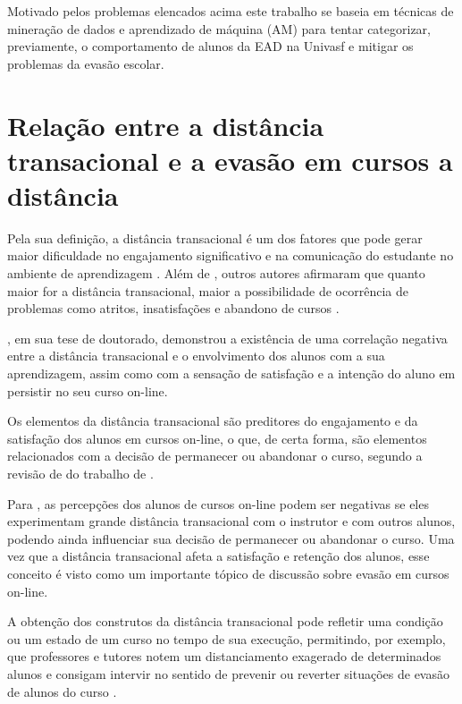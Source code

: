 Motivado pelos problemas elencados acima este trabalho se baseia em técnicas de
mineração de dados e aprendizado de máquina (AM) para tentar categorizar,
previamente, o comportamento de alunos da EAD na Univasf e mitigar os problemas
da evasão escolar.

\section{Relação entre a distância transacional e a evasão em cursos a distância}

Pela sua definição, a distância transacional é um dos fatores que pode gerar
maior dificuldade no engajamento significativo e na comunicação do estudante no
ambiente de aprendizagem \cite{goel2012transactional}. Além de
, outros autores afirmaram que quanto maior for a
distância transacional, maior a possibilidade de ocorrência de problemas como
atritos, insatisfações e abandono de cursos
\cite{zhang2003transactional,steinman2007educational,horzum2011developing,
mbwesa2014transactional,paul2015revisiting}.

, em sua tese de doutorado, demonstrou a
existência de uma correlação negativa entre a distância transacional e o
envolvimento dos alunos com a sua aprendizagem, assim como com a sensação de
satisfação e a intenção do aluno em persistir no seu curso on-line.

Os elementos da distância transacional são preditores do engajamento e da
satisfação dos alunos em cursos on-line, o que, de certa forma, são elementos
relacionados com a decisão de permanecer ou abandonar o curso, segundo a revisão
de  do trabalho de
.

Para , as percepções dos alunos de cursos
on-line podem ser negativas se eles experimentam grande distância transacional
com o instrutor e com outros alunos, podendo ainda influenciar sua decisão de
permanecer ou abandonar o curso. Uma vez que a distância transacional afeta a
satisfação e retenção dos alunos, esse conceito é visto como um importante
tópico de discussão sobre evasão em cursos on-line.

A obtenção dos construtos da distância transacional pode refletir uma condição
ou um estado de um curso no tempo de sua execução, permitindo, por exemplo, que
professores e tutores notem um distanciamento exagerado de determinados alunos e
consigam intervir no sentido de prevenir ou reverter situações de evasão de
alunos do curso \cite{horzum2011developing}.


